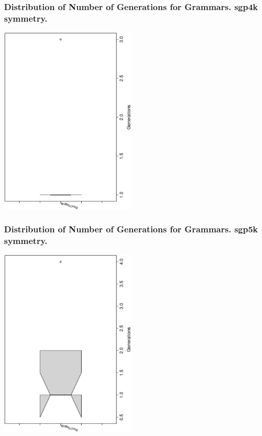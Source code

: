 \documentclass[18pt,c]{beamer}
\begin{document}
 \begin{frame}
 \frametitle{ Distribution of Number of Generations for Grammars. sgp4k  symmetry. }
 \begin{center}
\includegraphics[width=0.5\textwidth, angle=-90]
{ExpFboxplottGenerations002.eps}
 \end{center}
 \label{ExpFboxplottGenerations002.eps}  
 \end{frame}

 \begin{frame}
 \frametitle{ Distribution of Number of Generations for Grammars. sgp5k  symmetry. }
 \begin{center}
\includegraphics[width=0.5\textwidth, angle=-90]
{ExpFboxplottGenerations003.eps}
 \end{center}
 \label{ExpFboxplottGenerations003.eps}  
 \end{frame}
\end{document}
